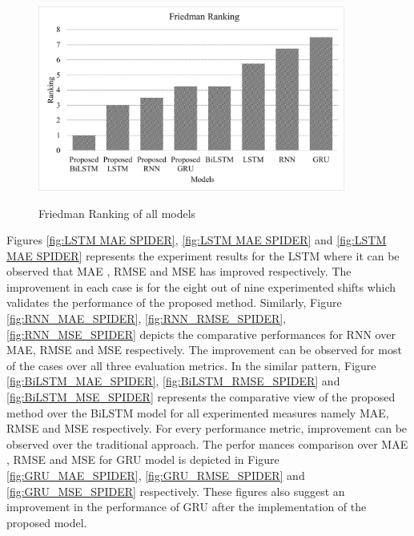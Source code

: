 \documentclass[sn-mathphys,Numbered]{sn-jnl}
\theoremstyle{thmstyleone}
\theoremstyle{thmstyletwo}
\theoremstyle{thmstylethree}
\begin{document}
\begin{figure}[ht!]
\centering
\includegraphics[width=0.9\textwidth, height=0.6\linewidth]{Graph.jpeg}
\label{fig:Friedman}
 \caption{Friedman Ranking of all models}
 \end{figure} 
\pagebreak
Figures \ref{fig:LSTM MAE SPIDER}, \ref{fig:LSTM MAE SPIDER} and \ref{fig:LSTM MAE SPIDER} represents the experiment results for the LSTM where it can be observed that MAE , RMSE and MSE has improved respectively. The improvement in each case is for the eight out of nine experimented shifts which validates the performance of the proposed method. Similarly, Figure \ref{fig:RNN_MAE_SPIDER}, \ref{fig:RNN_RMSE_SPIDER}, \ref{fig:RNN_MSE_SPIDER} depicts the comparative performances for RNN over MAE, RMSE and MSE respectively. The improvement can be observed for most of the cases over all three evaluation metrics. In the similar pattern, Figure \ref{fig:BiLSTM_MAE_SPIDER}, \ref{fig:BiLSTM_RMSE_SPIDER} and \ref{fig:BiLSTM_MSE_SPIDER} represents the comparative view of the proposed method over the BiLSTM model for all experimented measures namely MAE, RMSE and MSE respectively. For every performance metric, improvement can be observed over the traditional approach. The perfor 
 mances comparison over MAE , RMSE and MSE for GRU model is depicted in Figure \ref{fig:GRU_MAE_SPIDER}, \ref{fig:GRU_RMSE_SPIDER} and \ref{fig:GRU_MSE_SPIDER} respectively. These figures also suggest an improvement in the performance of GRU after the implementation of the proposed model.
\end{document}
